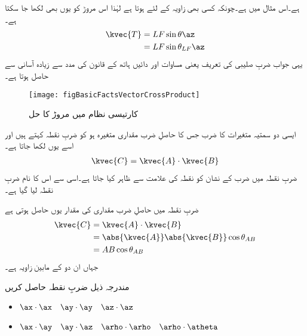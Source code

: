 ہے۔اس مثال میں  ہے۔چونکہ کسی بھی زاویہ    کے لئے  ہوتا ہے لہٰذا اس مروڑ کو یوں بھی لکھا جا سکتا ہے۔
\begin{align*}
\kvec{T}&=LF\sin \theta \az\\
&=L F \sin \theta_{LF}\az
\end{align*}
یہی جواب ضربِ صلیبی کی تعریف یعنی مساوات  اور دائیں ہاتھ کے قانون کی مدد سے زیادہ آسانی سے حاصل ہوتا ہے۔
%
\begin{figure}
\centering
\texttt{[image: figBasicFactsVectorCrossProduct]}
\caption{کارتیسی نظام میں مروڑ کا حل}
\label{شکل_حقائق_کارتیسی_مروڑ_کا_حل}
\end{figure}
%
ایسی دو سمتیہ متغیرات کا ضرب جس کا حاصلِ ضرب مقداری متغیرہ ہو کو ضربِ نقطہ کہتے ہیں اور اسے یوں لکھا جاتا ہے۔
\begin{align}
\kvec{C}=\kvec{A} \cdot \kvec{B}
\end{align}
ضربِ نقطہ میں ضرب کے نشان کو نقطہ کی علامت سے ظاہر کیا جاتا ہے۔اسی سے اس کا نام ضربِ نقطہ لیا گیا ہے۔

ضربِ نقطہ میں حاصلِ ضرب مقداری کی مقدار یوں حاصل ہوتی ہے
\begin{gather}
\begin{aligned}\label{مساوات_بنیادی_ضرب_نقطہ_تعریف}
\kvec{C}&=\kvec{A} \cdot \kvec{B}\\
&=\abs{\kvec{A}} \abs{\kvec{B}} \cos \theta_{AB}\\
&=A B \cos \theta_{AB}
\end{aligned}
\end{gather}
جہاں  ان دو کے مابین زاویہ ہے۔

مندرجہ ذیل ضربِ نقطہ حاصل کریں
\begin{itemize}
\item
$\ax \cdot \ax \quad \ay \cdot \ay \quad \az \cdot \az$\\
\item
$\ax \cdot \ay \quad \ay \cdot \az \quad \arho \cdot \arho \quad \arho \cdot \atheta$
\end{itemize}

